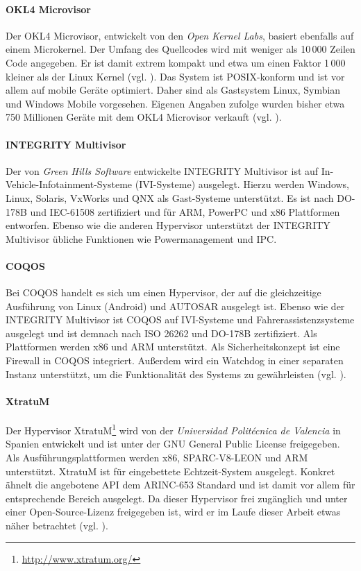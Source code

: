 \documentclass[
  a4paper,					    %
  twoside,
  DIV=calc,     				%
  bibliography=totoc,
  cleardoublepage=empty,
  ngerman,     					%
  final       					%
]{scrbook}
\begin{document}
\paragraph{OKL4 Microvisor}
Der OKL4 Microvisor, entwickelt von den \emph{Open Kernel Labs}, basiert ebenfalls auf einem Microkernel. Der Umfang des Quellcodes wird mit weniger als 10\,000 Zeilen Code angegeben. Er ist damit extrem kompakt und etwa um einen Faktor 1\,000 kleiner als der Linux Kernel (vgl. \cite{wiki:loc}). Das System ist POSIX-konform und ist vor allem auf mobile Geräte optimiert. Daher sind als Gastsystem Linux, Symbian und Windows Mobile vorgesehen. Eigenen Angaben zufolge wurden bisher etwa 750 Millionen Geräte mit dem OKL4 Microvisor verkauft (vgl. \cite{okl4}).

\paragraph{INTEGRITY Multivisor}
Der von \emph{Green Hills Software} entwickelte INTEGRITY Multivisor ist auf In-Vehicle-Infotainment-Systeme (IVI-Systeme) ausgelegt. Hierzu werden Windows, Linux, Solaris, VxWorks und QNX als Gast-Systeme unterstützt. Es ist nach DO-178B und IEC-61508 zertifiziert und für ARM, PowerPC und x86 Plattformen entworfen. Ebenso wie die anderen Hypervisor unterstützt der INTEGRITY Multivisor übliche Funktionen wie Powermanagement und IPC.

\paragraph{COQOS}
Bei COQOS handelt es sich um einen Hypervisor, der auf die gleichzeitige Ausführung von Linux (Android) und AUTOSAR ausgelegt ist. Ebenso wie der INTEGRITY Multivisor ist COQOS auf IVI-Systeme und Fahrerassistenzsysteme ausgelegt und ist demnach nach ISO 26262 und DO-178B zertifiziert. Als Plattformen werden x86 und ARM unterstützt. Als Sicherheitskonzept ist eine Firewall in COQOS integriert. Außerdem wird ein Watchdog in einer separaten Instanz unterstützt, um die Funktionalität des Systems zu gewährleisten (vgl. \cite{coqos}).

\paragraph{XtratuM}
Der Hypervisor XtratuM\footnote{\url{http://www.xtratum.org/}} wird von der \emph{Universidad Politécnica de Valencia} in Spanien entwickelt und ist unter der GNU General Public License freigegeben. Als Ausführungsplattformen werden x86, SPARC-V8-LEON und ARM unterstützt. XtratuM ist für eingebettete Echtzeit-System ausgelegt. Konkret ähnelt die angebotene API dem ARINC-653 Standard und ist damit vor allem für entsprechende Bereich ausgelegt. Da dieser Hypervisor frei zugänglich und unter einer Open-Source-Lizenz freigegeben ist, wird er im Laufe dieser Arbeit etwas näher betrachtet (vgl. \cite{xm:usermanual}).
\end{document}
